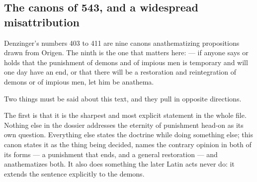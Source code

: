 \subsection{The canons of 543, and a widespread misattribution}

Denzinger's numbers 403 to 411 are nine canons anathematizing propositions drawn from Origen. The ninth is the one that matters here:  --- if anyone says or holds that the punishment of demons and of impious men is temporary and will one day have an end, or that there will be a restoration and reintegration of demons or of impious men, let him be anathema.

Two things must be said about this text, and they pull in opposite directions.

The first is that it is the sharpest and most explicit statement in the whole file. Nothing else in the dossier addresses the eternity of punishment head-on as its own question. Everything else states the doctrine while doing something else; this canon states it as the thing being decided, names the contrary opinion in both of its forms --- a punishment that ends, and a general restoration --- and anathematizes both. It also does something the later Latin acts never do: it extends the sentence explicitly to the demons.

